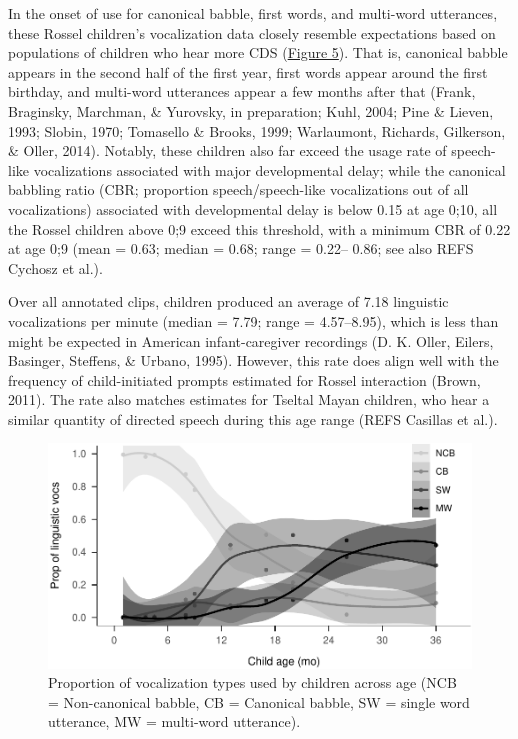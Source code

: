 \documentclass[,man,floatsintext]{apa6}
\begin{document}
In the onset of use for canonical babble, first words, and multi-word
utterances, these Rossel children's vocalization data closely resemble
expectations based on populations of children who hear more CDS
(\protect\hyperlink{fig5}{Figure 5}). That is, canonical babble appears
in the second half of the first year, first words appear around the
first birthday, and multi-word utterances appear a few months after that
(Frank, Braginsky, Marchman, \& Yurovsky, in preparation; Kuhl, 2004;
Pine \& Lieven, 1993; Slobin, 1970; Tomasello \& Brooks, 1999;
Warlaumont, Richards, Gilkerson, \& Oller, 2014). Notably, these
children also far exceed the usage rate of speech-like vocalizations
associated with major developmental delay; while the canonical babbling
ratio (CBR; proportion speech/speech-like vocalizations out of all
vocalizations) associated with developmental delay is below 0.15 at age
0;10, all the Rossel children above 0;9 exceed this threshold, with a
minimum CBR of 0.22 at age 0;9 (mean = 0.63; median = 0.68; range =
0.22-- 0.86; see also REFS Cychosz et al.).

Over all annotated clips, children produced an average of 7.18
linguistic vocalizations per minute (median = 7.79; range = 4.57--8.95),
which is less than might be expected in American infant-caregiver
recordings (D. K. Oller, Eilers, Basinger, Steffens, \& Urbano, 1995).
However, this rate does align well with the frequency of child-initiated
prompts estimated for Rossel interaction (Brown, 2011). The rate also
matches estimates for Tseltal Mayan children, who hear a similar
quantity of directed speech during this age range (REFS Casillas et
al.).

\begin{figure}
\centering
\includegraphics{Yeli-CLE_files/figure-latex/fig5-1.pdf}
\caption{\label{fig:fig5}Proportion of vocalization types used by children
across age (NCB = Non-canonical babble, CB = Canonical babble, SW =
single word utterance, MW = multi-word utterance).}
\end{figure}
\end{document}
